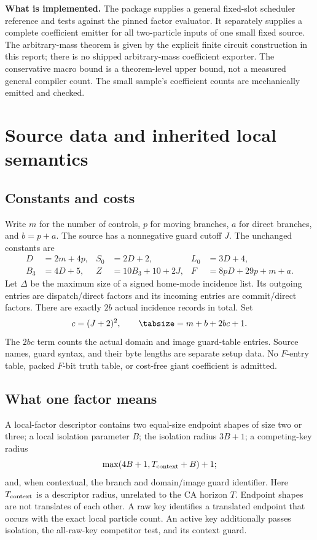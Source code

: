 \documentclass[11pt,a4paper]{article}
\numberwithin{equation}{section}
\begin{document}
\textbf{What is implemented.} The package supplies a general fixed-slot scheduler reference and tests against the pinned factor evaluator. It separately supplies a complete coefficient emitter for all two-particle inputs of one small fixed source. The arbitrary-mass theorem is given by the explicit finite circuit construction in this report; there is no shipped arbitrary-mass coefficient exporter. The conservative macro bound is a theorem-level upper bound, not a measured general compiler count. The small sample's coefficient counts are mechanically emitted and checked.

\section{Source data and inherited local semantics}\label{fpa:eb:sec:source}
\subsection{Constants and costs}
Write $m$ for the number of controls, $p$ for moving branches, $a$ for direct branches, and $b=p+a$. The source has a nonnegative guard cutoff $J$. The unchanged constants are
\begin{align*}
D&=2m+4p,& S_0&=2D+2,&L_0&=3D+4,\\
B_3&=4D+5,&Z&=10B_3+10+2J,&F&=8pD+29p+m+a.
\end{align*}
Let $\Delta$ be the maximum size of a signed home-mode incidence list. Its outgoing entries are dispatch/direct factors and its incoming entries are commit/direct factors. There are exactly $2b$ actual incidence records in total. Set
\[
c=(J+2)^2,\qquad \tabsize=m+b+2bc+1.
\]
The $2bc$ term counts the actual domain and image guard-table entries. Source names, guard syntax, and their byte lengths are separate setup data. No $F$-entry table, packed $F$-bit truth table, or cost-free giant coefficient is admitted.

\subsection{What one factor means}
A local-factor descriptor contains two equal-size endpoint shapes of size two or three; a local isolation parameter $B$; the isolation radius $3B+1$; a competing-key radius
\[
\max(4B+1,T_{\rm context}+B)+1;
\]
and, when contextual, the branch and domain/image guard identifier. Here $T_{\rm context}$ is a descriptor radius, unrelated to the CA horizon $T$. Endpoint shapes are not translates of each other. A raw key identifies a translated endpoint that occurs with the exact local particle count. An active key additionally passes isolation, the all-raw-key competitor test, and its context guard.
\end{document}
